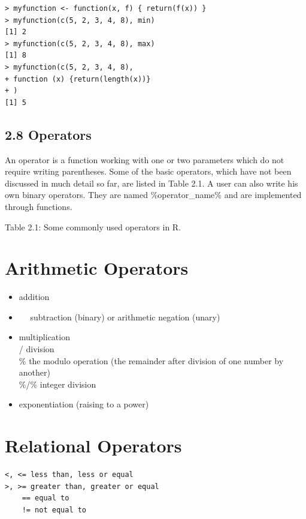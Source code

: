 \documentclass[10pt]{book}
\begin{document}
\begin{verbatim}
> myfunction <- function(x, f) { return(f(x)) }
> myfunction(c(5, 2, 3, 4, 8), min)
[1] 2
> myfunction(c(5, 2, 3, 4, 8), max)
[1] 8
> myfunction(c(5, 2, 3, 4, 8),
+ function (x) {return(length(x))}
+ )
[1] 5
\end{verbatim}

\subsection*{2.8 Operators}
An operator is a function working with one or two parameters which do not require writing parentheses. Some of the basic operators, which have not been discussed in much detail so far, are listed in Table 2.1. A user can also write his own binary operators. They are named \%operator\_name\% and are implemented through functions.

Table 2.1: Some commonly used operators in R.

\section*{Arithmetic Operators}
\begin{itemize}
  \item addition
\end{itemize}

\begin{itemize}
  \item $\quad$ subtraction (binary) or arithmetic negation (unary)
\end{itemize}

\begin{itemize}
  \item multiplication\\
/ division\\
$\%$ the modulo operation (the remainder after division of one number by another)\\
\%/\% integer division
\end{itemize}

\begin{itemize}
  \item exponentiation (raising to a power)
\end{itemize}

\section*{Relational Operators}
\begin{verbatim}
<, <= less than, less or equal
>, >= greater than, greater or equal
    == equal to
    != not equal to
\end{verbatim}
\end{document}

